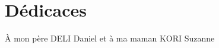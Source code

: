 \chapter*{Dédicaces}
\begin{center}
    \vspace{1cm}
À mon père DELI Daniel et à ma maman KORI Suzanne
\end{center} 
